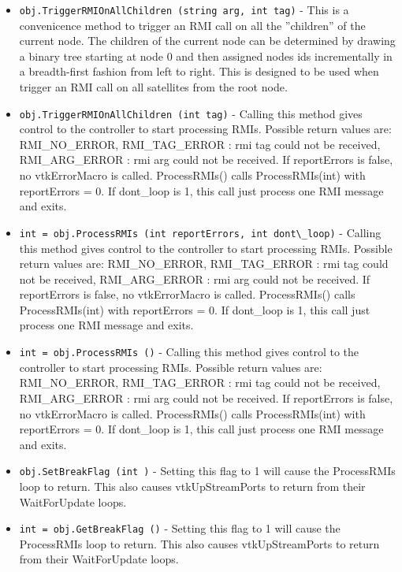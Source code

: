 \begin{itemize}
\item  \verb|obj.TriggerRMIOnAllChildren (string arg, int tag)| -  This is a convenicence method to trigger an RMI call on all the ''children''
 of the current node. The children of the current node can be determined by
 drawing a binary tree starting at node 0 and then assigned nodes ids
 incrementally in a breadth-first fashion from left to right. This is
 designed to be used when trigger an RMI call on all satellites from the
 root node.

\item  \verb|obj.TriggerRMIOnAllChildren (int tag)| -  Calling this method gives control to the controller to start
 processing RMIs. Possible return values are:
 RMI\_NO\_ERROR,
 RMI\_TAG\_ERROR : rmi tag could not be received,
 RMI\_ARG\_ERROR : rmi arg could not be received.
 If reportErrors is false, no vtkErrorMacro is called.
 ProcessRMIs() calls ProcessRMIs(int) with reportErrors = 0.
 If dont\_loop is 1, this call just process one RMI message
 and exits.

\item  \verb|int = obj.ProcessRMIs (int reportErrors, int dont\_loop)| -  Calling this method gives control to the controller to start
 processing RMIs. Possible return values are:
 RMI\_NO\_ERROR,
 RMI\_TAG\_ERROR : rmi tag could not be received,
 RMI\_ARG\_ERROR : rmi arg could not be received.
 If reportErrors is false, no vtkErrorMacro is called.
 ProcessRMIs() calls ProcessRMIs(int) with reportErrors = 0.
 If dont\_loop is 1, this call just process one RMI message
 and exits.

\item  \verb|int = obj.ProcessRMIs ()| -  Calling this method gives control to the controller to start
 processing RMIs. Possible return values are:
 RMI\_NO\_ERROR,
 RMI\_TAG\_ERROR : rmi tag could not be received,
 RMI\_ARG\_ERROR : rmi arg could not be received.
 If reportErrors is false, no vtkErrorMacro is called.
 ProcessRMIs() calls ProcessRMIs(int) with reportErrors = 0.
 If dont\_loop is 1, this call just process one RMI message
 and exits.

\item  \verb|obj.SetBreakFlag (int )| -  Setting this flag to 1 will cause the ProcessRMIs loop to return.
 This also causes vtkUpStreamPorts to return from
 their WaitForUpdate loops.

\item  \verb|int = obj.GetBreakFlag ()| -  Setting this flag to 1 will cause the ProcessRMIs loop to return.
 This also causes vtkUpStreamPorts to return from
 their WaitForUpdate loops.


\end{itemize}
